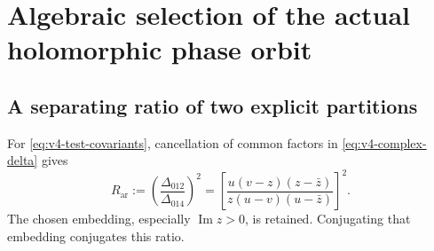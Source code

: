 \documentclass[11pt]{article}
\theoremstyle{definition}
\theoremstyle{remark}
\begin{document}
\section{Algebraic selection of the actual holomorphic phase orbit}
\label{sec:v4-orbit-selection}

\subsection{A separating ratio of two explicit partitions}
For \eqref{eq:v4-test-covariants}, cancellation of common factors in
\eqref{eq:v4-complex-delta} gives
\begin{equation}
 R_{\mathrm{ar}}
 :=\left(\frac{\Delta_{012}}{\Delta_{014}}\right)^2
 =\left[
 \frac{u(v-z)(z-\bar z)}{z(u-v)(u-\bar z)}
 \right]^2.
 \label{eq:v4-explicit-ratio}
\end{equation}
The chosen embedding, especially $\operatorname{Im}z>0$, is retained.
Conjugating that embedding conjugates this ratio.
\end{document}
